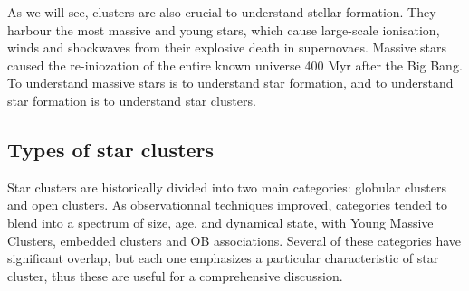 As we will see, clusters are also crucial to understand stellar formation. They harbour the most massive and young stars, which cause large-scale ionisation, winds and shockwaves from their explosive death in supernovaes. Massive stars caused the re-iniozation of the entire known universe 400 Myr after the Big Bang. To understand massive stars is to understand star formation, and to understand star formation is to understand star clusters.



%
%

\subsection{Types of star clusters}

Star clusters are historically divided into two main categories: globular clusters and open clusters. As observationnal techniques improved, categories tended to blend into a spectrum of size, age, and dynamical state, with Young Massive Clusters, embedded clusters and OB associations. Several of these categories have significant overlap, but each one emphasizes a particular characteristic of star cluster, thus these are useful for a comprehensive discussion.



